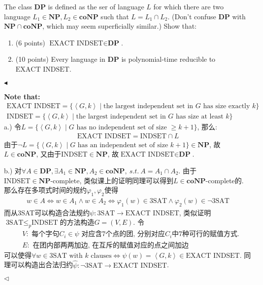 \documentclass[11pt]{article}
\newcommand{\NP}{\mathbf{NP}}
\newcommand{\NPC}{\mathbf{NP}\text{-complete}}
\newcommand{\coNP}{\mathbf{coNP}}
\newcommand{\1}{\mathbf{1}}
\newenvironment{problem}[2][Problem]{\begin{trivlist}
\item[\hskip \labelsep{\bfseries#1}\hskip\labelsep{\bfseries#2.}]}{\hfill$\blacktriangleleft$\end{trivlist}}
\newenvironment{answer}[1][Answer]{\begin{trivlist}
\item[\hskip \labelsep{\bfseries\itshape#1.}\hskip \labelsep]}{\hfill$\lhd$\end{trivlist}}
\begin{document}
\begin{problem}{4.(16 points)}
    The class \textbf{DP} is defined as the ser of language $L$ for which there are two language $L_1 \in \NP, L_2 \in \coNP$  such that $L = L_1 \cap L_2$. (Don't confuse \textbf{DP} with $\NP\cap \coNP$, which may seem superficially similar.) Show that:
    \begin{enumerate}[label = \alph*.)]
        \item (6 points) $\text{EXACT INDSET} \in \textbf{DP}$.
        \item (10 points) Every language in $\textbf{DP}$ is polynomial-time reducible to $\text{EXACT INDSET}$.
    \end{enumerate}
\end{problem}
\begin{answer}
    {\bf Note that: }
    \begin{align*}
        \text{EXACT INDSET} = \{ \left\langle G, k \right\rangle \mid \text{the largest independent set in $G$ has size exactly $k$}\}\\
        \text{INDSET} = \{ \left\langle G, k \right\rangle \mid \text{the largest independent set in $G$ has size at least $k$}\}
    \end{align*} 
    a.) 令$L = \{\left\langle G, k \right\rangle \mid G \text{ has no independent set of size $\ge k+1$} \}$, 那么:
    \begin{align*}
        \text{EXACT INDSET} = \text{INDSET} \cap L
    \end{align*}
    由于$\neg L = \{\left\langle G, k \right\rangle\mid G \text{ has an independent set of size $k+1$}\} \in \NP$, 故$L \in \coNP$, 又由于$\text{INDSET} \in \NP$, 故$\text{EXACT INDSET} \in \textbf{DP}$.

    b.) 对$\forall A \in \textbf{DP}, \exists A_1 \in \NP, A_2 \in \coNP, ~s.t.~ A = A_1 \cap A_2$. 由于$\text{INDSET} \in \NPC$, 类似课上的证明同理可以得到$L\in \coNP$-complete的. 那么存在多项式时间的规约$\varphi_1, \varphi_2$使得
    \begin{align*}
        w \in A \iff w\in A_1 \land w\in A_2 \iff \varphi_1(w) \in \text{3SAT} \land \varphi_2(w) \in \neg \text{3SAT} 
    \end{align*}
    而从3SAT可以构造合法规约$\psi: \text{3SAT} \rightarrow \text{EXACT INDSET}$, 类似证明$\text{3SAT} \le_p \text{INDSET}$的方法构造$G = (V,E)$. 令
    \begin{align*}
        &V: \text{ 每个字句$C_i \in \psi$ 对应含7个点的团, 分别对应$C_i$中7种可行的赋值方式.} \\
        &E: \text{ 在团内部两两加边, 在互斥的赋值对应的点之间加边}
    \end{align*}
    可以使得$\forall w \in \text{3SAT with $k$ clauses} \iff \psi(w) = \left\langle G, k \right\rangle \in \text{EXACT INDSET}$.
    同理可以构造出合法归约$\widehat{\psi}: \neg\text{3SAT} \rightarrow \text{EXACT INDSET}$.


\end{answer}
\end{document}
